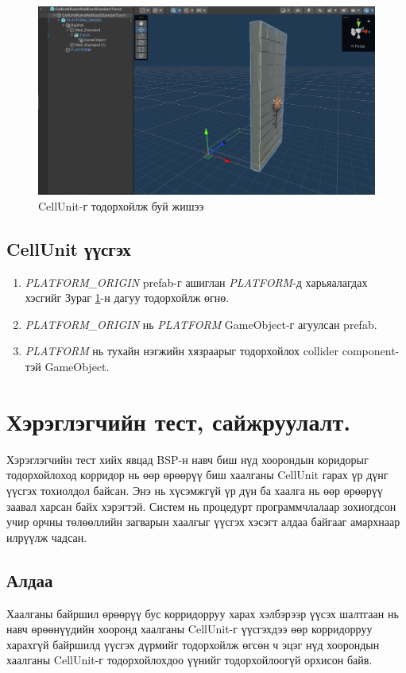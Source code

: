 \begin{figure}[b]
	\centering
	\includegraphics[width=\textwidth-2cm]{./images/CellUnit.png}
	\caption{CellUnit-г тодорхойлж буй жишээ}
	\label{fig:CellUnit}
\end{figure}
\subsection{CellUnit үүсгэх}
\begin{enumerate}
	\item \textit{PLATFORM\_ORIGIN} prefab-г ашиглан \textit{PLATFORM}-д харьяалагдах хэсгийг Зураг \ref{fig:CellUnit}-н дагуу тодорхойлж өгнө.
	\item \textit{PLATFORM\_ORIGIN} нь \textit{PLATFORM} GameObject-г агуулсан prefab.
	\item \textit{PLATFORM} нь тухайн нэгжийн хязраарыг тодорхойлох collider component-тэй GameObject.
\end{enumerate}

\section{Хэрэглэгчийн тест, сайжруулалт.}
Хэрэглэгчийн тест хийх явцад BSP-н навч биш нүд хоорондын коридорыг тодорхойлоход корридор нь өөр өрөөрүү биш хаалганы CellUnit гарах үр дүнг үүсгэх тохиолдол байсан. Энэ нь хүсэмжгүй үр дүн ба хаалга нь өөр өрөөрүү заавал харсан байх хэрэгтэй. Систем нь процедурт программчлалаар зохиогдсон учир орчны төлөөллийн загварын хаалгыг үүсгэх хэсэгт алдаа байгааг амархнаар илрүүлж чадсан.
\subsection{Алдаа}
Хаалганы байршил өрөөрүү бус корридорруу харах хэлбэрээр үүсэх шалтгаан нь навч өрөөнүүдийн хооронд хаалганы CellUnit-г үүсгэхдээ өөр корридорруу харахгүй байршилд үүсгэх дүрмийг тодорхойлж өгсөн ч эцэг нүд хоорондын хаалганы CellUnit-г тодорхойлохдоо үүнийг тодорхойлоогүй орхисон байв.
